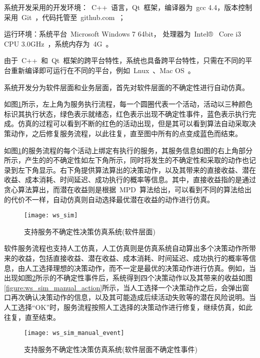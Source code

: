 系统开发采用的开发环境：~C++~语言，Qt~框架，编译器为~gcc 4.4，版本控制采用~Git~，代码托管至~github.com~；

运行环境：系统平台~Microsoft Windows 7 64bit， 处理器为~Intel® ~Core i3 CPU 3.0GHz~，系统内存为~4G~。

由于~C++~和~Qt~框架的跨平台特性，系统也具备跨平台特性，只需在不同的平台重新编译即可运行在不同的平台，例如~Lnux~、Mac OS~。

系统开发分为软件层面和业务层面，首先对软件层面的不确定性进行自动仿真。

如图\ref{figure:ws_sim}所示，左上角为服务执行流程，每一个圆圈代表一个活动，活动以三种颜色标识其执行状态，绿色表示就绪态，红色表示出现不确定性事件，蓝色表示执行完成。仿真的过程可以看到不断的红色的活动出现，但是其可以看到算法自动采取决策动作，之后修复服务流程，以此往复，直至图中所有的点变成蓝色而结束。

如图\ref{figure:ws_sim}的服务流程的每个活动上绑定有执行的服务，其服务信息如图的右上角部分所示，产生的的不确定性如左下角所示，同时将发生的不确定性和采取的动作也记录到左下角显示。右下角提供算法算出的决策动作，以及其带来的直接收益、潜在收益、成本消耗、时间延迟、成功执行的概率等信息。其中，直接收益指的是通过贪心算法算出，而潜在收益则是根据~MPD~算法给出，可以看到不同的算法给出的代价不一样，自动仿真则自动选择最优潜在收益的动作进行仿真。

\begin{figure}[htbp]
    \centering
    \texttt{[image: ws\_sim]}
    \caption{支持服务不确定性决策仿真系统(软件层面)}\label{figure:ws_sim}
    \vspace{-1em}
\end{figure}

软件服务流程也支持人工仿真，人工仿真则是仿真系统自动算出多个决策动作所带来的收益，包括直接收益、潜在收益、成本消耗、时间延迟、成功执行的概率等信息，由人工选择理想的决策动作，而不一定是最优的决策动作进行仿真。例如，当出现如图\ref{figure:ws_sim_manual_event}所示的不确定性事件后，系统得到四个决策动作以及其带来的收益如图\ref{figure:ws_sim_manual_action}所示，当人工选择一个决策动作之后，会弹出窗口再次确认决策动作的信息，以及其可能造成后续活动失败等的潜在风险说明。当人工选择“OK”时，服务流程按照人工选择的决策动作进行修复，继续仿真，如此往复，直至结束。

\begin{figure}[htbp]
    \centering
    \texttt{[image: ws\_sim\_manual\_event]}
    \caption{支持服务不确定性决策仿真系统(软件层面不确定性事件)}\label{figure:ws_sim_manual_event}
    \vspace{-1em}
\end{figure}


